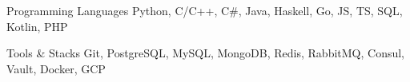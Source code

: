 

\begin{cvskills}

  \cvskill
    {Programming Languages} %
    {Python, C/C++, C\#, Java, Haskell, Go, JS, TS, SQL, Kotlin, PHP} %

  \cvskill
    {Tools \& Stacks} %
    {Git, PostgreSQL, MySQL, MongoDB, Redis, RabbitMQ, Consul, Vault, Docker, GCP} %

\end{cvskills}

